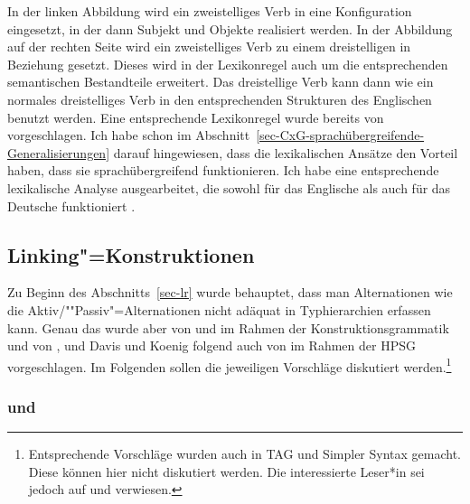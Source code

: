 In der linken Abbildung wird ein zweistelliges Verb in eine Konfiguration eingesetzt, in der dann
Subjekt und Objekte realisiert werden. In der Abbildung auf der rechten Seite wird ein zweistelliges
Verb zu einem dreistelligen in Beziehung gesetzt. Dieses wird in der Lexikonregel auch um die
entsprechenden semantischen Bestandteile erweitert. Das dreistellige Verb kann dann wie ein normales
dreistelliges Verb in den entsprechenden Strukturen des Englischen benutzt werden. Eine
entsprechende Lexikonregel wurde bereits von \citet[Abschnitt~5]{BC99a} vorgeschlagen.
Ich habe schon im
Abschnitt~\ref{sec-CxG-sprachübergreifende-Generalisierungen} darauf hingewiesen, dass die lexikalischen Ansätze den Vorteil haben, dass sie
sprachübergreifend funktionieren. Ich habe eine entsprechende lexikalische Analyse ausgearbeitet,
die sowohl für das Englische als auch für das Deutsche funktioniert \citep{MuellerLFGphrasal}.



\subsection{Linking"=Konstruktionen}
\label{cxg-hpsg-linking-konstruktionen}

Zu Beginn des Abschnitts~\ref{sec-lr} wurde behauptet, dass man Alternationen wie die
Aktiv/""Passiv"=Alternationen nicht adäquat in Typhierarchien erfassen kann. 
Genau das wurde aber von \citet{KF99a} und \citet[264]{vanTrijp2025a} im Rahmen der Konstruktionsgrammatik und 
von \citet{Koenig99a}, \citet{DK2000b-u} und Davis und Koenig folgend
auch von \citet{Kordoni2001b-u} im Rahmen der HPSG vorgeschlagen. Im
Folgenden sollen die jeweiligen Vorschläge diskutiert werden.\footnote{
  Entsprechende Vorschläge wurden auch in TAG\indextag \parencites{Candito96a}[]{CK2003a-u} und Simpler Syntax \citep[Abschnitt~6.3]{CJ2005a} gemacht. Diese können hier nicht diskutiert werden. Die interessierte Leser*in sei jedoch auf  und  verwiesen.
}

\subsubsection{\citet{KF99a} und \citet{MR2001a}}
\label{cxg-linking-konstruktionen}

